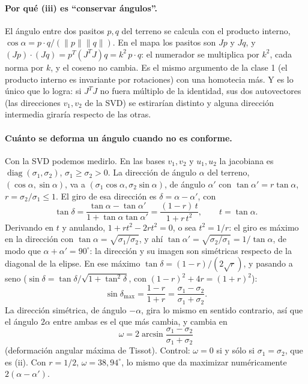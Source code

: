 \paragraph{Por qué (iii) es ``conservar ángulos''.} El ángulo entre dos pasitos \(p,q\)
del terreno se calcula con el producto interno, \(\cos\alpha=p\cdot q/(\|p\|\|q\|)\). En el
mapa los pasitos son \(Jp\) y \(Jq\), y \((Jp)\cdot(Jq)=p^T(J^TJ)q=k^2\,p\cdot q\): el
numerador se multiplica por \(k^2\), cada norma por \(k\), y el coseno no cambia. Es el
mismo argumento de la clase 1 (el producto interno es invariante por rotaciones) con una
homotecia más. Y es lo único que lo logra: si \(J^TJ\) no fuera múltiplo de la identidad,
sus dos autovectores (las direcciones \(v_1,v_2\) de la SVD) se estirarían distinto y
alguna dirección intermedia giraría respecto de las otras.

\paragraph{Cuánto se deforma un ángulo cuando no es conforme.} Con la SVD podemos
medirlo. En las bases \(v_1,v_2\) y \(u_1,u_2\) la jacobiana es \(\operatorname{diag}(\sigma_1,\sigma_2)\),
\(\sigma_1\ge\sigma_2>0\). La dirección de ángulo \(\alpha\) del terreno,
\((\cos\alpha,\sin\alpha)\), va a \((\sigma_1\cos\alpha,\sigma_2\sin\alpha)\), de ángulo
\(\alpha'\) con \(\tan\alpha'=r\tan\alpha\), \(r=\sigma_2/\sigma_1\le1\). El giro de esa
dirección es \(\delta=\alpha-\alpha'\), con
\[
  \tan\delta=\frac{\tan\alpha-\tan\alpha'}{1+\tan\alpha\tan\alpha'}
  =\frac{(1-r)\,t}{1+r\,t^2},\qquad t=\tan\alpha .
\]
Derivando en \(t\) y anulando, \(1+rt^2-2rt^2=0\), o sea \(t^2=1/r\): el giro es máximo
en la dirección con \(\tan\alpha=\sqrt{\sigma_1/\sigma_2}\), y ahí
\(\tan\alpha'=\sqrt{\sigma_2/\sigma_1}=1/\tan\alpha\), de modo que \(\alpha+\alpha'=90^\circ\):
la dirección y su imagen son simétricas respecto de la diagonal de la elipse. En ese
máximo \(\tan\delta=(1-r)/(2\sqrt r)\), y pasando a seno
(\(\sin\delta=\tan\delta/\sqrt{1+\tan^2\delta}\), con \((1-r)^2+4r=(1+r)^2\)):
\[
  \sin\delta_{\max}=\frac{1-r}{1+r}=\frac{\sigma_1-\sigma_2}{\sigma_1+\sigma_2}.
\]
La dirección simétrica, de ángulo \(-\alpha\), gira lo mismo en sentido contrario, así
que el ángulo \(2\alpha\) entre ambas es el que más cambia, y cambia en
\[
  \boxed{\ \omega=2\arcsin\frac{\sigma_1-\sigma_2}{\sigma_1+\sigma_2}\ }
\]
(deformación angular máxima de Tissot). Control: \(\omega=0\) si y sólo si
\(\sigma_1=\sigma_2\), que es (ii). Con \(r=1/2\), \(\omega=38{,}94^\circ\), lo mismo
que da maximizar numéricamente \(2(\alpha-\alpha')\).

